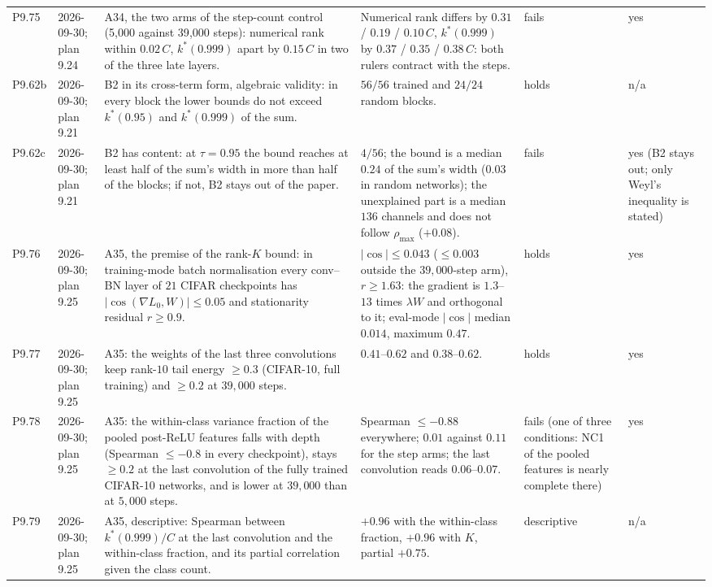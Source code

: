 \begin{longtable}{p{1.1cm}p{1.4cm}p{6.2cm}p{4.6cm}p{2.0cm}p{1.6cm}}
P9.75 & 2026-09-30; plan 9.24 & A34, the two arms of the step-count control (5{,}000 against 39{,}000 steps): numerical rank within $0.02\,C$, $k^*(0.999)$ apart by $0.15\,C$ in two of the three late layers. & Numerical rank differs by $0.31$ / $0.19$ / $0.10\,C$, $k^*(0.999)$ by $0.37$ / $0.35$ / $0.38\,C$: both rulers contract with the steps. & fails & yes \\
P9.62b & 2026-09-30; plan 9.21 & B2 in its cross-term form, algebraic validity: in every block the lower bounds do not exceed $k^*(0.95)$ and $k^*(0.999)$ of the sum. & $56/56$ trained and $24/24$ random blocks. & holds & n/a \\
P9.62c & 2026-09-30; plan 9.21 & B2 has content: at $\tau = 0.95$ the bound reaches at least half of the sum's width in more than half of the blocks; if not, B2 stays out of the paper. & $4/56$; the bound is a median $0.24$ of the sum's width ($0.03$ in random networks); the unexplained part is a median $136$ channels and does not follow $\rho_{\max}$ ($+0.08$). & fails & yes (B2 stays out; only Weyl's inequality is stated) \\
P9.76 & 2026-09-30; plan 9.25 & A35, the premise of the rank-$K$ bound: in training-mode batch normalisation every conv--BN layer of $21$ CIFAR checkpoints has $|\cos(\nabla L_0, W)| \le 0.05$ and stationarity residual $r \ge 0.9$. & $|\cos| \le 0.043$ ($\le 0.003$ outside the $39{,}000$-step arm), $r \ge 1.63$: the gradient is $1.3$--$13$ times $\lambda W$ and orthogonal to it; eval-mode $|\cos|$ median $0.014$, maximum $0.47$. & holds & yes \\
P9.77 & 2026-09-30; plan 9.25 & A35: the weights of the last three convolutions keep rank-$10$ tail energy $\ge 0.3$ (CIFAR-10, full training) and $\ge 0.2$ at $39{,}000$ steps. & $0.41$--$0.62$ and $0.38$--$0.62$. & holds & yes \\
P9.78 & 2026-09-30; plan 9.25 & A35: the within-class variance fraction of the pooled post-ReLU features falls with depth (Spearman $\le -0.8$ in every checkpoint), stays $\ge 0.2$ at the last convolution of the fully trained CIFAR-10 networks, and is lower at $39{,}000$ than at $5{,}000$ steps. & Spearman $\le -0.88$ everywhere; $0.01$ against $0.11$ for the step arms; the last convolution reads $0.06$--$0.07$. & fails (one of three conditions: NC1 of the pooled features is nearly complete there) & yes \\
P9.79 & 2026-09-30; plan 9.25 & A35, descriptive: Spearman between $k^*(0.999)/C$ at the last convolution and the within-class fraction, and its partial correlation given the class count. & $+0.96$ with the within-class fraction, $+0.96$ with $K$, partial $+0.75$. & descriptive & n/a \\

\end{longtable}
